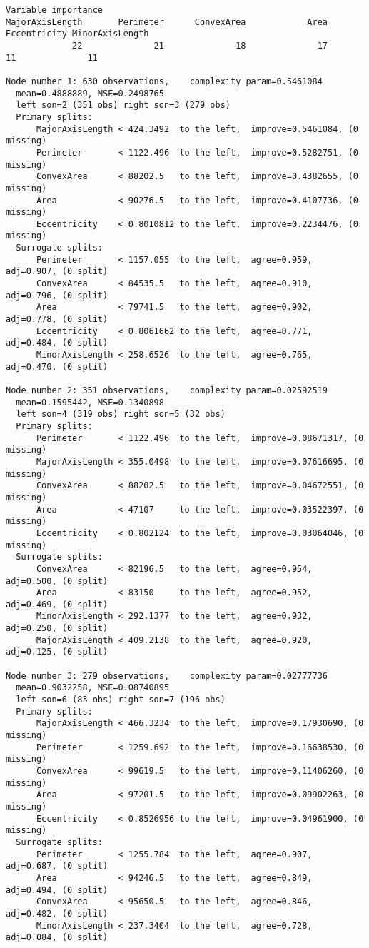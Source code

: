 \documentclass{article}
\begin{document}
\begin{thebibliography}{9}
\begin{verbatim}
Variable importance
MajorAxisLength       Perimeter      ConvexArea            Area    Eccentricity MinorAxisLength 
             22              21              18              17              11              11 

Node number 1: 630 observations,    complexity param=0.5461084
  mean=0.4888889, MSE=0.2498765 
  left son=2 (351 obs) right son=3 (279 obs)
  Primary splits:
      MajorAxisLength < 424.3492  to the left,  improve=0.5461084, (0 missing)
      Perimeter       < 1122.496  to the left,  improve=0.5282751, (0 missing)
      ConvexArea      < 88202.5   to the left,  improve=0.4382655, (0 missing)
      Area            < 90276.5   to the left,  improve=0.4107736, (0 missing)
      Eccentricity    < 0.8010812 to the left,  improve=0.2234476, (0 missing)
  Surrogate splits:
      Perimeter       < 1157.055  to the left,  agree=0.959, adj=0.907, (0 split)
      ConvexArea      < 84535.5   to the left,  agree=0.910, adj=0.796, (0 split)
      Area            < 79741.5   to the left,  agree=0.902, adj=0.778, (0 split)
      Eccentricity    < 0.8061662 to the left,  agree=0.771, adj=0.484, (0 split)
      MinorAxisLength < 258.6526  to the left,  agree=0.765, adj=0.470, (0 split)

Node number 2: 351 observations,    complexity param=0.02592519
  mean=0.1595442, MSE=0.1340898 
  left son=4 (319 obs) right son=5 (32 obs)
  Primary splits:
      Perimeter       < 1122.496  to the left,  improve=0.08671317, (0 missing)
      MajorAxisLength < 355.0498  to the left,  improve=0.07616695, (0 missing)
      ConvexArea      < 88202.5   to the left,  improve=0.04672551, (0 missing)
      Area            < 47107     to the left,  improve=0.03522397, (0 missing)
      Eccentricity    < 0.802124  to the left,  improve=0.03064046, (0 missing)
  Surrogate splits:
      ConvexArea      < 82196.5   to the left,  agree=0.954, adj=0.500, (0 split)
      Area            < 83150     to the left,  agree=0.952, adj=0.469, (0 split)
      MinorAxisLength < 292.1377  to the left,  agree=0.932, adj=0.250, (0 split)
      MajorAxisLength < 409.2138  to the left,  agree=0.920, adj=0.125, (0 split)

Node number 3: 279 observations,    complexity param=0.02777736
  mean=0.9032258, MSE=0.08740895 
  left son=6 (83 obs) right son=7 (196 obs)
  Primary splits:
      MajorAxisLength < 466.3234  to the left,  improve=0.17930690, (0 missing)
      Perimeter       < 1259.692  to the left,  improve=0.16638530, (0 missing)
      ConvexArea      < 99619.5   to the left,  improve=0.11406260, (0 missing)
      Area            < 97201.5   to the left,  improve=0.09902263, (0 missing)
      Eccentricity    < 0.8526956 to the left,  improve=0.04961900, (0 missing)
  Surrogate splits:
      Perimeter       < 1255.784  to the left,  agree=0.907, adj=0.687, (0 split)
      Area            < 94246.5   to the left,  agree=0.849, adj=0.494, (0 split)
      ConvexArea      < 95650.5   to the left,  agree=0.846, adj=0.482, (0 split)
      MinorAxisLength < 237.3404  to the left,  agree=0.728, adj=0.084, (0 split)


\end{verbatim}
\end{thebibliography}
\end{document}
